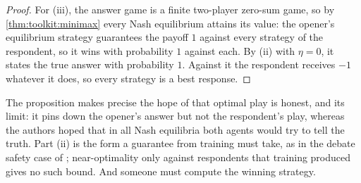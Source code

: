 \begin{refsection}
\begin{proof}
For (iii), the answer game is a finite two-player zero-sum game, so by \cref{thm:toolkit:minimax} every Nash equilibrium attains its value: the opener's equilibrium strategy guarantees the payoff $1$ against every strategy of the respondent, so it wins with probability $1$ against each. By (ii) with $\eta=0$, it states the true answer with probability $1$. Against it the respondent receives $-1$ whatever it does, so every strategy is a best response.
\end{proof}

The proposition makes precise the hope of \textcite{IrvingEtAl2018} that optimal play is honest, and its limit: it pins down the opener's answer but not the respondent's play, whereas the authors hoped that in all Nash equilibria both agents would try to tell the truth. Part (ii) is the form a guarantee from training must take, as in the debate safety case of \textcite{BuhlEtAl2025}; near-optimality only against respondents that training produced gives no such bound. And someone must compute the winning strategy.



\end{refsection}
